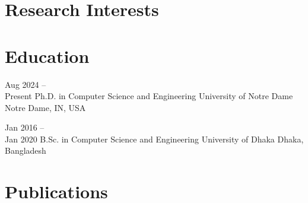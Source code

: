 \documentclass{academic-cv}
\begin{document}
\makecvheader

\section{Research Interests}
\begin{cvlist}
\end{cvlist}

\section{Education}
\begin{cvlist}
    \cventry
        {Aug 2024 --\\ Present}
        {Ph.D. in Computer Science and Engineering}
        {University of Notre Dame}
        {Notre Dame, IN, USA}

    \cventry
        {Jan 2016 --\\ Jan 2020}
        {B.Sc. in Computer Science and Engineering}
        {University of Dhaka}
        {Dhaka, Bangladesh}
\end{cvlist}

\section{Publications}

{\setlength{\cvitemsep}{1.4ex}}

\end{document}
